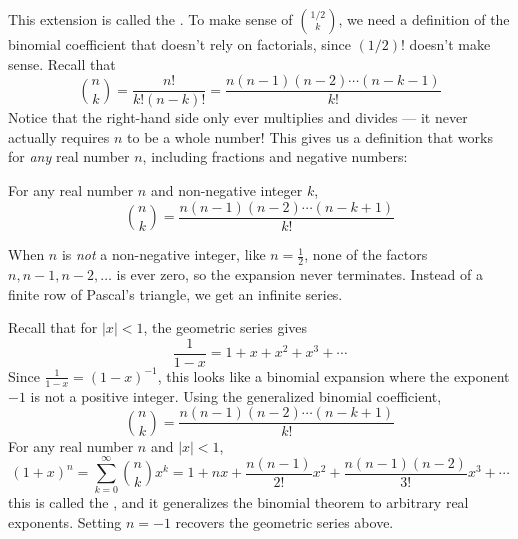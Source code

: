 This extension is called the \textbf{}. To make sense of $\binom{1/2}{k}$, we need a definition of the binomial coefficient that doesn't rely on factorials, since $(1/2)!$ doesn't make sense. Recall that
\begin{equation*}
\binom{n}{k} = \frac{n!}{k!(n-k)!} = \frac{n(n-1)(n-2)\cdots(n-k-1)}{k!}
\end{equation*}
Notice that the right-hand side only ever multiplies and divides — it never actually requires $n$ to be a whole number! This gives us a definition that works for \emph{any} real number $n$, including fractions and negative numbers:
\begin{mdframed}[frametitle = {Generalized Binomial Coefficient}, style = important]
For any real number $n$ and non-negative integer $k$,
\begin{equation*}
\binom{n}{k} = \frac{n(n-1)(n-2)\cdots(n-k+1)}{k!}
\end{equation*}
\end{mdframed}

When $n$ is \emph{not} a non-negative integer, like $n = \frac{1}{2}$, none of the factors $n, n-1, n-2, \ldots$ is ever zero, so the expansion never terminates. Instead of a finite row of Pascal's triangle, we get an infinite series.

\begin{mdframed}[frametitle = {General Binomial Theorem}, style = important]
Recall that for $|x| < 1$, the geometric series gives
\begin{equation*}
    \frac{1}{1-x} = 1 + x + x^2 + x^3 + \cdots
\end{equation*}
Since $\frac{1}{1-x} = (1-x)^{-1}$, this looks like a binomial expansion where the exponent $-1$ is not a positive integer. Using the generalized binomial coefficient,
\begin{equation*}
    \binom{n}{k} = \frac{n(n-1)(n-2)\cdots(n-k+1)}{k!}
\end{equation*}
For any real number $n$ and $|x| < 1$,
\begin{equation*}
(1+x)^n = \sum_{k=0}^{\infty} \binom{n}{k}x^k = 1 + nx + \frac{n(n-1)}{2!}x^2 + \frac{n(n-1)(n-2)}{3!}x^3 + \cdots
\end{equation*}
this is called the , and it generalizes the binomial theorem to arbitrary real exponents. Setting $n = -1$ recovers the geometric series above.
\end{mdframed}

